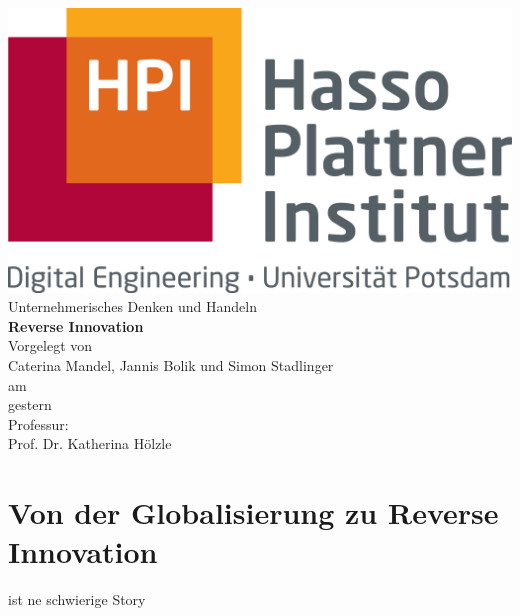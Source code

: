 \documentclass[a4paper,11pt]{scrartcl}
\author{Simon  Stadlinger}
\begin{document}
	\begin{titlepage}
		\centering
		\includegraphics[scale=.6]{hpi_logo.jpg}\\\vspace{2cm}
		{\Large Unternehmerisches Denken und Handeln}\\\vspace{2cm}
		{\Huge \textbf{Reverse Innovation}}\\\vspace{2cm}
		{\large Vorgelegt von}\\\vspace{.5cm}
		{\Large Caterina Mandel, Jannis Bolik und Simon Stadlinger  }\\\vspace{.5cm}
		{\large am}\\\vspace{.5cm}
		{\Large gestern }\\\vspace{5cm}
		{\large Professur:}\\\vspace{.5cm}
		{\Large Prof. Dr. Katherina Hölzle}
		
		
	\end{titlepage}
\newpage
\thispagestyle{empty}
\section*{}
\newpage
\pagestyle{fancy}



\tableofcontents\newpage
\section{Von der Globalisierung zu Reverse Innovation}
ist ne schwierige Story
\end{document}
